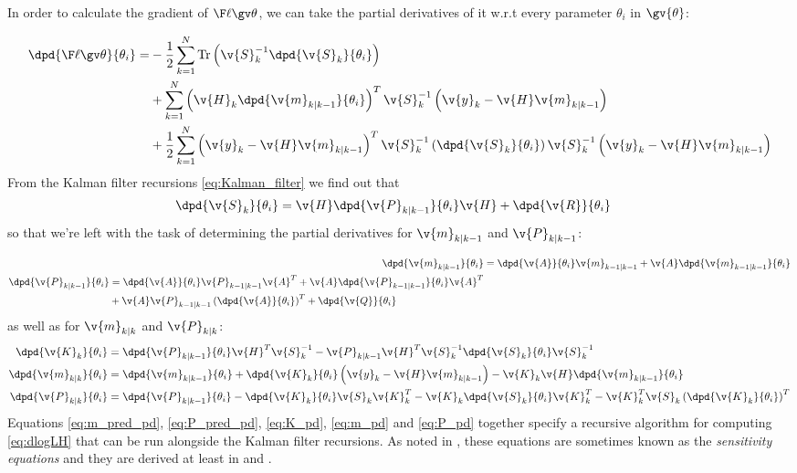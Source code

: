 In order to calculate the gradient of $\lLH$, we can take the partial
derivatives of it w.r.t every parameter $\theta_i$ in $\gv{\theta}$:

\begin{align}
\begin{split}
	\dpd{\lLH}{\theta_i}
	=&-\frac{1}{2}\sum_{k=1}^N\mathrm{Tr}\left(\v{S}_{k}^{-1}\dpd{\v{S}_k}{\theta_i}\right)\\
	&+\sum_{k=1}^N\left(\v{H}_k\dpd{\v{m}_{k|k-1}}{\theta_i}\right)^T\v{S}_{k}^{-1}\left(\v{y}_k-\v{H}\v{m}_{k|k-1}\right)\\
	&+\frac{1}{2}\sum_{k=1}^N\left(\v{y}_k-\v{H}\v{m}_{k|k-1}\right)^T\v{S}_{k}^{-1}\left(\dpd{\v{S}_k}{\theta_i}\right)\v{S}_{k}^{-1}\left(\v{y}_k-\v{H}\v{m}_{k|k-1}\right)\\
	\label{eq:dlogLH}
\end{split}
\end{align}
From the Kalman filter recursions \eqref{eq:Kalman_filter} we find out that 
\begin{align}
	\dpd{\v{S}_k}{\theta_i}&=\v{H}\dpd{\v{P}_{k|k-1}}{\theta_i}\v{H}+\dpd{\v{R}}{\theta_i}
\end{align}
so that we're left with the task of determining the partial derivatives for
$\v{m}_{k|k-1}$ and $\v{P}_{k|k-1}$:

\begin{align}
	\dpd{\v{m}_{k|k-1}}{\theta_i}&=\dpd{\v{A}}{\theta_i}\v{m}_{k-1|k-1}+\v{A}\dpd{\v{m}_{k-1|k-1}}{\theta_i} \label{eq:m_pred_pd}\\
	\begin{split}
	\dpd{\v{P}_{k|k-1}}{\theta_i}&=\dpd{\v{A}}{\theta_i}\v{P}_{k-1|k-1}\v{A}^T+\v{A}\dpd{\v{P}_{k-1|k-1}}{\theta_i}\v{A}^T\\
	&+\v{A}\v{P}_{k-1|k-1}\left(\dpd{\v{A}}{\theta_i}\right)^T+\dpd{\v{Q}}{\theta_i} \label{eq:P_pred_pd}
	\end{split}
\end{align}
as well as for $\v{m}_{k|k}$ and $\v{P}_{k|k}$:
\begin{align}
	\dpd{\v{K}_k}{\theta_i}&=\dpd{\v{P}_{k|k-1}}{\theta_i}\v{H}^T\v{S}_{k}^{-1}-\v{P}_{k|k-1}\v{H}^T\v{S}_{k}^{-1}\dpd{\v{S}_k}{\theta_i}\v{S}_{k}^{-1}
	\label{eq:K_pd}\\
	\dpd{\v{m}_{k|k}}{\theta_i}&=\dpd{\v{m}_{k|k-1}}{\theta_i}+\dpd{\v{K}_k}{\theta_i}\left(\v{y}_k-\v{H}\v{m}_{k|k-1}\right)-\v{K}_k\v{H}\dpd{\v{m}_{k|k-1}}{\theta_i}
	\label{eq:m_pd}\\
	\dpd{\v{P}_{k|k}}{\theta_i}&=\dpd{\v{P}_{k|k-1}}{\theta_i}-\dpd{\v{K}_k}{\theta_i}\v{S}_{k}\v{K}_{k}^T-\v{K}_{k}\dpd{\v{S}_k}{\theta_i}\v{K}_{k}^T-\v{K}_{k}^T\v{S}_{k}\left(\dpd{\v{K}_k}{\theta_i}\right)^T
	\label{eq:P_pd}
	\end{align}
Equations \eqref{eq:m_pred_pd}, \eqref{eq:P_pred_pd}, \eqref{eq:K_pd}, \eqref{eq:m_pd} and \eqref{eq:P_pd} together specify
a recursive algorithm for computing \eqref{eq:dlogLH} that can be run alongside the Kalman filter recursions.
As noted in \textcite{Cappe2005}, these equations are sometimes known as the \emph{sensitivity equations}
and they are derived at least in \textcite{Gupta1974} and \textcite{Mbalawataa}.

